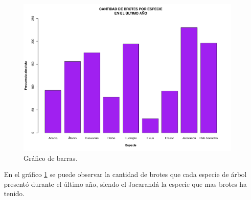 \documentclass[11pt]{article}
\begin{document}
\begin{figure}[h!]
  \begin{center}
    \includegraphics[width=0.9\linewidth]{barrasBrotesEspecie.pdf}
    \caption{Gráfico de barras.}
    \label{fig:barrasBrotesEspecie}
  \end{center}  
\end{figure}

\begin{justify}
  En el gráfico \ref{fig:barrasBrotesEspecie} se puede observar la cantidad
  de brotes que cada especie de árbol presentó durante el último año, siendo
  el Jacarandá la especie que mas brotes ha tenido.
\end{justify}
\end{document}
